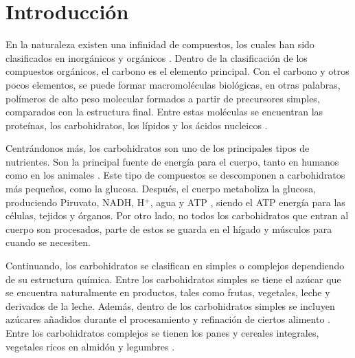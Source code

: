 \documentclass[fleqn,10pt]{SelfArx}
\begin{document}
\flushbottom %

\maketitle %

\thispagestyle{empty} %




\section*{Introducci\'on} %
	En la naturaleza existen una infinidad de compuestos, los cuales han sido clasificados en inorgánicos y orgánicos \cite{ebbing2010quimica}. Dentro de la clasificación de los compuestos orgánicos, el carbono es el elemento principal. Con el carbono y otros pocos elementos, se puede formar macromoléculas biológicas, en otras palabras, polímeros de alto peso molecular formados a partir de precursores simples, comparados con la estructura final. Entre estas moléculas se encuentran las proteínas, los carbohidratos, los lípidos y los ácidos nucleicos \cite{blanco2017gustavo, nelson2008lehninger}.
	
	Centrándonos más, los carbohidratos son uno de los principales tipos de nutrientes. Son la principal fuente de energía para el cuerpo, tanto en humanos como en los animales \cite{martin2001bioquimica}. Este tipo de compuestos se descomponen a carbohidratos más pequeños, como la glucosa. Después, el cuerpo metaboliza la glucosa, produciendo Piruvato, NADH, H$^+$, agua y ATP \cite{nelson2008lehninger}, siendo el ATP energía para las células, tejidos y órganos. Por otro lado, no todos los carbohidratos que entran al cuerpo son procesados, parte de estos se guarda en el hígado y músculos para cuando se necesiten.
	
	Continuando, los carbohidratos se clasifican en simples o complejos dependiendo de su estructura química. Entre los carbohidratos simples se tiene el azúcar que se encuentra naturalmente en productos, tales como frutas, vegetales, leche y derivados de la leche. Además, dentro de los carbohidratos simples se incluyen azúcares añadidos durante el procesamiento y refinación de ciertos alimento \cite{maite}. Entre los carbohidratos complejos se tienen los panes y cereales integrales, vegetales ricos en almidón y legumbres \cite{maite}.
	
\end{document}
